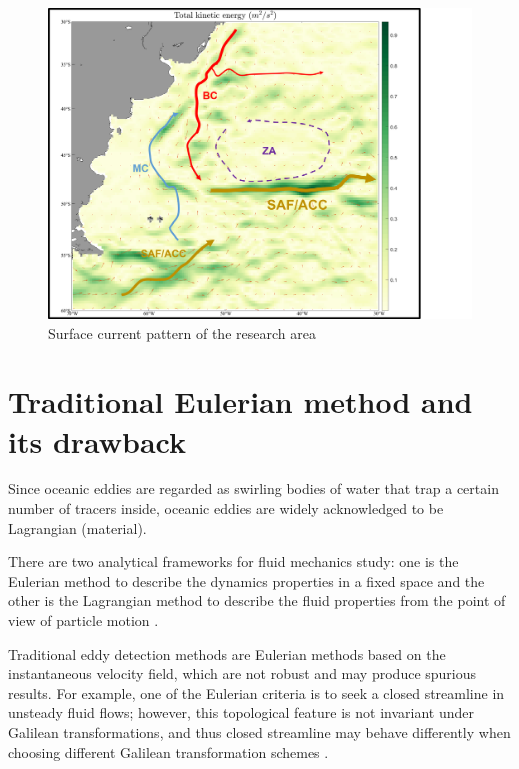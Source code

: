 \begin{figure}[hbtp]
  \centering
  \includegraphics[width=15cm]{chapter/figure/surface flow with notion.png}
  \caption
  {Surface current pattern of the research area}
  \label{surface flow pattern}
\end{figure}

\section{Traditional Eulerian method and its drawback}

Since oceanic eddies are regarded as swirling bodies of water that trap a certain number of tracers inside, oceanic eddies are widely acknowledged to be Lagrangian (material).

There are two analytical frameworks for fluid mechanics study: one is the Eulerian method to describe the dynamics properties in a fixed space and the other is the Lagrangian method to describe the fluid properties from the point of view of particle motion \cite{kasten2011extraction}. 

Traditional eddy detection methods are Eulerian methods based on the instantaneous velocity field, which are not robust and may produce spurious results. For example, one of the Eulerian criteria is to seek a closed streamline in unsteady fluid flows; however, this topological feature is not invariant under Galilean transformations, and thus closed streamline may behave differently when choosing different Galilean transformation schemes \cite{kasten2011extraction}.


